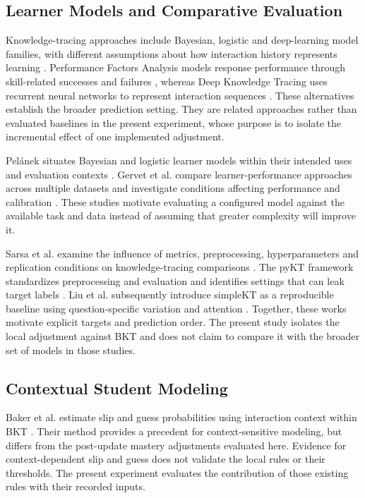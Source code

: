 \documentclass[conference]{IEEEtran}
\begin{document}
\subsection{Learner Models and Comparative Evaluation}
Knowledge-tracing approaches include Bayesian, logistic and deep-learning model families, with different assumptions about how interaction history represents learning \cite{shen2024survey}. Performance Factors Analysis models response performance through skill-related successes and failures \cite{pavlik2009pfa}, whereas Deep Knowledge Tracing uses recurrent neural networks to represent interaction sequences \cite{piech2015dkt}. These alternatives establish the broader prediction setting. They are related approaches rather than evaluated baselines in the present experiment, whose purpose is to isolate the incremental effect of one implemented adjustment.

Pel{\'{a}}nek situates Bayesian and logistic learner models within their intended uses and evaluation contexts \cite{pelanek2017}. Gervet et al. compare learner-performance approaches across multiple datasets and investigate conditions affecting performance and calibration \cite{gervet2020}. These studies motivate evaluating a configured model against the available task and data instead of assuming that greater complexity will improve it.

Sarsa et al. examine the influence of metrics, preprocessing, hyperparameters and replication conditions on knowledge-tracing comparisons \cite{sarsa2022}. The pyKT framework standardizes preprocessing and evaluation and identifies settings that can leak target labels \cite{liu2022pykt}. Liu et al. subsequently introduce simpleKT as a reproducible baseline using question-specific variation and attention \cite{liu2023simplekt}. Together, these works motivate explicit targets and prediction order. The present study isolates the local adjustment against BKT and does not claim to compare it with the broader set of models in those studies.

\subsection{Contextual Student Modeling}
Baker et al. estimate slip and guess probabilities using interaction context within BKT \cite{baker2008context}. Their method provides a precedent for context-sensitive modeling, but differs from the post-update mastery adjustments evaluated here. Evidence for context-dependent slip and guess does not validate the local rules or their thresholds. The present experiment evaluates the contribution of those existing rules with their recorded inputs.
\end{document}
